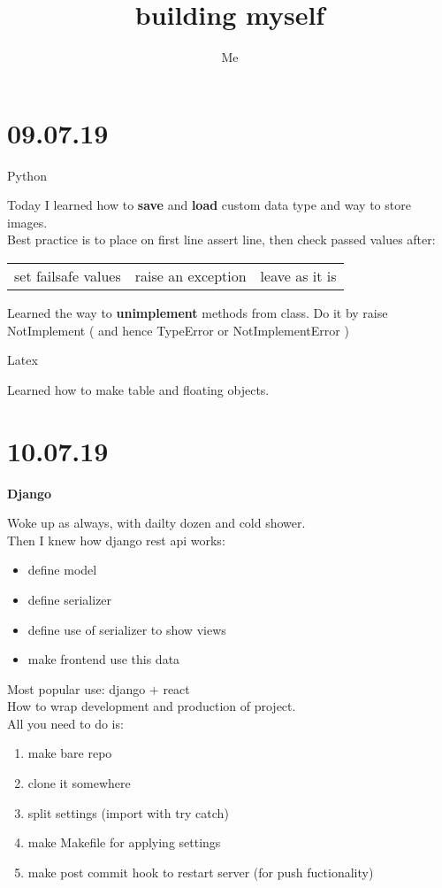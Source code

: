 \documentclass[12pt,a4paper,titlepage]{article}
\author{Me}
\title{building myself}
\begin{document}
\maketitle \tableofcontents
\newpage

\section{09.07.19}
\begin{center}
    \large Python
\end{center}
Today I learned how to \textbf{save} and \textbf{load} custom data type and way to store images.\\
Best practice is to place on first line assert line, then check passed values after: 
\begin{center}
    \begin{tabular}[t]{c | c | c}
        set failsafe values & raise an exception & leave as it is
    \end{tabular}
\end{center}
Learned the way to \textbf{unimplement} methods from class. 
Do it by raise Not\-Imp\-lement ( and hence TypeError or NotImplementError ) 

\begin{center}
    \large Latex 
\end{center}
Learned how to make table and floating objects.


\newpage
\section{10.07.19}
\begin{center}
    \large \textbf{Django}
\end{center}
Woke up as always, with dailty dozen and cold shower.\\
Then I knew how django rest api works:
\begin{itemize}
    \item{define model}
    \item{define serializer}
    \item{define use of serializer to show views}
    \item{make frontend use this data}
\end{itemize}
Most popular use: django $+$ react\\
How to wrap development and production of project.\\
All you need to do is: 
\begin{enumerate}
    \item{make bare repo}
    \item{clone it somewhere}
    \item{split settings (import with try catch)}
    \item{make Makefile for applying settings}
    \item{make post commit hook to restart server (for push fuctionality)}
\end{enumerate}
\end{document}
